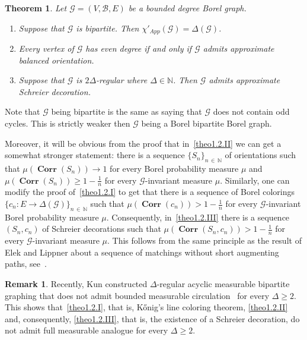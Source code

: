 \documentclass[10pt]{amsart}
\newtheorem{theo}[cdrthm]{Theorem}
\theoremstyle{definition}
\newtheorem{rema}[cdrthm]{Remark}
\DeclareMathOperator{\Corr}{\mathbf{Corr}}
\newcommand{\clG}{\mathcal{G}}
\newcommand{\clB}{\mathcal{B}}
\newcommand{\bbZ}{\mathbb{N}}
\newcommand*{\Romanenumi}{\renewcommand*{\theenumi}{\Roman{enumi}}}
\begin{document}
\begin{theo}\label{th:main}
Let $\clG=(V,\clB,E)$ be a bounded degree Borel graph.
\begin{enumerate}\Romanenumi
\item\label{theo1.2.I} Suppose that $\clG$ is bipartite. Then $\chi'_{App}(\clG)=\Delta(\clG)$.
\item\label{theo1.2.II} Every vertex of $\clG$ has even degree if and only if $\clG$ admits approximate balanced orientation.
\item\label{theo1.2.III} Suppose that $\clG$ is $2\Delta$-regular where $\Delta\in \bbZ$. Then $\clG$ admits approximate Schreier decoration.
\end{enumerate}
\end{theo}


Note that $\clG$ being bipartite is the same as saying that $\clG$ does not contain odd cycles. This is strictly weaker then $\clG$ being a Borel bipartite Borel graph.

Moreover, it will be obvious from the proof that in~\eqref{theo1.2.II} we can get a somewhat stronger statement: there is a sequence $\{S_n\}_{n\,\in\,\bbZ}$ of orientations such that $\mu(\Corr(S_n))\to 1$ for every Borel probability measure $\mu$ and $\mu(\Corr(S_n))\ge 1-\tfrac{1}{n}$ for every $\clG$-invariant measure $\mu$. Similarly, one can modify the proof of~\eqref{theo1.2.I} to get that there is a sequence of Borel colorings $\{c_n:E\to \Delta(\clG)\}_{n\,\in\,\bbZ}$ such that $\mu(\Corr(c_n))> 1-\tfrac{1}{n}$ for every $\clG$-invariant Borel probability measure $\mu$. Consequently, in~\eqref{theo1.2.III} there is a sequence $(S_n,c_n)$ of Schreier decorations such that $\mu(\Corr(S_n,c_n))>1-\tfrac{1}{n}$ for every $\clG$-invariant measure $\mu$. This follows from the same principle as the result of Elek and Lippner about a sequence of matchings without short augmenting paths, see~\cite{ElekLippner}.

\begin{rema}
Recently, Kun constructed $\Delta$-regular acyclic measurable bipartite graphing that does not admit bounded measurable circulation~\cite[Theorem~1]{Kun} for every $\Delta\ge 2$. This shows that~\eqref{theo1.2.I}, that is, Kőnig's line coloring theorem, \eqref{theo1.2.II} and, consequently, \eqref{theo1.2.III}, that is, the existence of a Schreier decoration, do not admit full measurable analogue for every $\Delta\ge 2$.
\end{rema}
\end{document}
